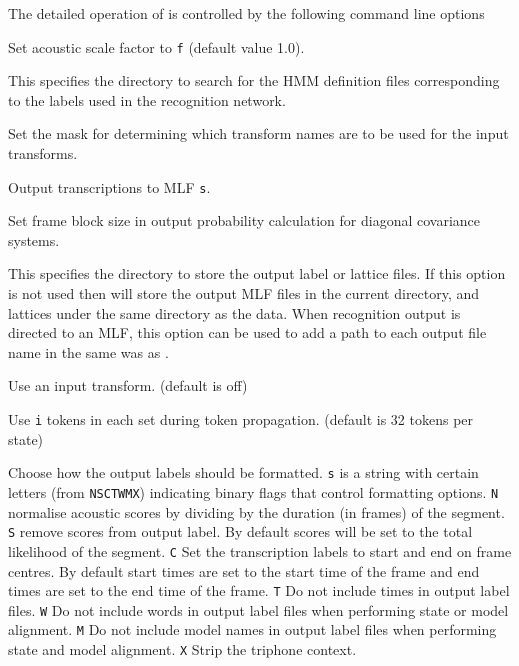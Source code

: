 The detailed operation of  is controlled by the following
command line options
\begin{optlist}

   Set acoustic scale factor to \texttt{f} (default value 1.0).

   This specifies the directory to search for the
        HMM definition files corresponding to the labels used in
        the recognition network.

   Set the mask for determining which transform names are 
	to be used for the input transforms. 

   Output transcriptions to MLF \texttt{s}.

   Set frame block size in output probability calculation for
  diagonal covariance systems.

   This specifies the directory to store the output
        label or lattice files.  If this option is not used then  will store 
        the output MLF files in the current directory, and lattices
        under the same directory as the data. 
        When recognition output is directed to an MLF, this option can
        be used to add a path to each output file name in the same was as .

   Use an input transform. (default is off)

   Use \texttt{i} tokens in each set during token
  propagation. (default is 32 tokens per state) 

   Choose how the output labels should be formatted.
        \texttt{s} is a string with certain letters (from \texttt{NSCTWMX}) 
        indicating binary flags that control formatting options. 
        \texttt{N} normalise acoustic scores by dividing by the duration
        (in frames) of the segment.
        \texttt{S} remove scores from output label.  By default 
        scores will be set to the total likelihood of the segment.
        \texttt{C} Set the transcription labels to start and end on
        frame centres. By default start times are set to the start
        time of the frame and end times are set to the end time of 
        the frame.
        \texttt{T} Do not include times in output label files.
        \texttt{W} Do not include words in output label files
        when performing state or model alignment.
        \texttt{M} Do not include model names in output label
        files when performing state and model alignment.
        \texttt{X} Strip the triphone context.


\end{optlist}
